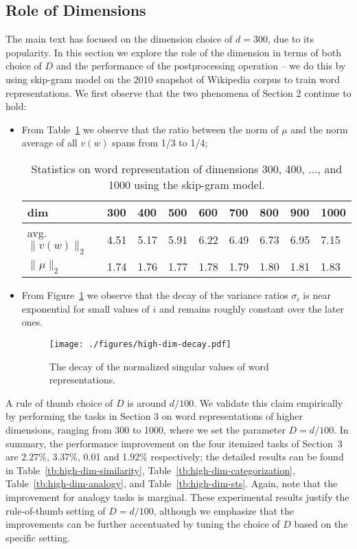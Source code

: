 \documentclass{article} \usepackage{acl2017,times}
\begin{document}
\subsection{Role of Dimensions}
The main text has focused on the dimension choice of $d=300$, due to its popularity.  In this section we explore the role of the dimension in terms of both choice of $D$ and  the performance of the postprocessing operation -- we do this by using skip-gram model on the 2010 snapshot of Wikipedia corpus \citep{al2013polyglot} to train word representations. We first observe that the two phenomena of Section 2  continue to hold: 
\begin{itemize}
\item From Table~\ref{tb:high-dim-stat} we  observe that the ratio between the norm of $\mu$ and the norm average of all $v(w)$ spans from 1/3 to 1/4;
\begin{table}[!h]
\centering
\begin{tabular}{|l||l|l|l|l|l|l|l|l|}
\hline
 dim               & 300  & 400  & 500  & 600  & 700  & 800  & 900  & 1000 \\ \hline
 avg. $\|v(w)\|_2$ & 4.51 & 5.17 & 5.91 & 6.22 & 6.49 & 6.73 & 6.95 & 7.15 \\ \hline
$\|\mu\|_2$           & 1.74 & 1.76 & 1.77 & 1.78 & 1.79 & 1.80 & 1.81 & 1.83 \\ \hline
\end{tabular}
\caption{Statistics on word representation of dimensions 300, 400, ..., and 1000 using the skip-gram model.}
\label{tb:high-dim-stat}
\end{table}
\item From Figure~\ref{fig:high-dim-decay} we  observe that the decay of the variance ratios $\sigma_i$ is near exponential for small values of $i$ and remains roughly constant over the later ones. 
\begin{figure}[!h]
\centering
\texttt{[image: ./figures/high-dim-decay.pdf]}
\caption{The decay of the normalized singular values of word representations.}
\label{fig:high-dim-decay}
\end{figure}
\end{itemize}

A rule of thumb choice of $D$ is around $d/100$. We validate this claim empirically by performing the tasks in Section 3 on word representations of higher dimensions, ranging from 300 to 1000, where we set the parameter $D = d/100$.  
In summary, the performance improvement on the four itemized tasks of Section~3 are 2.27\%, 3.37\%, 0.01 and 1.92\% respectively;  the detailed results can be found in  Table~\ref{tb:high-dim-similarity}, Table~\ref{tb:high-dim-categorization}, Table~\ref{tb:high-dim-analogy}, and Table~\ref{tb:high-dim-sts}. Again, note that the improvement for analogy tasks is marginal.  These experimental results justify the rule-of-thumb setting of $D = d/100$, although we emphasize that the  improvements can be further accentuated by tuning the choice of $D$ based on the specific setting. 
\end{document}
